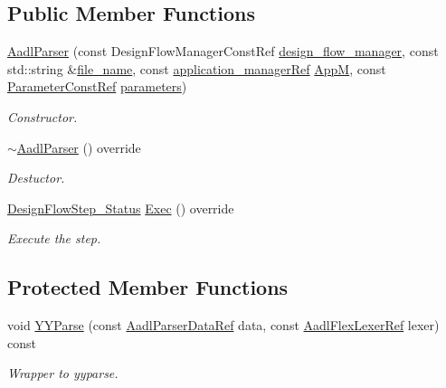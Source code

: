 \subsection*{Public Member Functions}
\begin{DoxyCompactItemize}
\item 
\hyperlink{classAadlParser_a7b62919f918da617e84f4bc2bec3f2c0}{Aadl\+Parser} (const Design\+Flow\+Manager\+Const\+Ref \hyperlink{classDesignFlowStep_ab770677ddf087613add30024e16a5554}{design\+\_\+flow\+\_\+manager}, const std\+::string \&\hyperlink{classParserFlowStep_a728b0a03e63e3529176b848880d12c72}{file\+\_\+name}, const \hyperlink{application__manager_8hpp_a04ccad4e5ee401e8934306672082c180}{application\+\_\+manager\+Ref} \hyperlink{classAadlParser_a3caa16a2aa1b023109ad23c60ee372d6}{AppM}, const \hyperlink{Parameter_8hpp_a37841774a6fcb479b597fdf8955eb4ea}{Parameter\+Const\+Ref} \hyperlink{classDesignFlowStep_a802eaafe8013df706370679d1a436949}{parameters})
\begin{DoxyCompactList}\small\item\em Constructor. \end{DoxyCompactList}\item 
\hyperlink{classAadlParser_ae24dea5fda2320c5a3dd44807557a1ed}{$\sim$\+Aadl\+Parser} () override
\begin{DoxyCompactList}\small\item\em Destuctor. \end{DoxyCompactList}\item 
\hyperlink{design__flow__step_8hpp_afb1f0d73069c26076b8d31dbc8ebecdf}{Design\+Flow\+Step\+\_\+\+Status} \hyperlink{classAadlParser_aded0aad8f9b66318957f0df1d027256b}{Exec} () override
\begin{DoxyCompactList}\small\item\em Execute the step. \end{DoxyCompactList}\end{DoxyCompactItemize}
\subsection*{Protected Member Functions}
\begin{DoxyCompactItemize}
\item 
void \hyperlink{classAadlParser_acecaf8ee4223f68c15c7d8087b09e544}{Y\+Y\+Parse} (const \hyperlink{aadl__parser_8hpp_a3c21c833ee79a0a6153a4d8549698b31}{Aadl\+Parser\+Data\+Ref} data, const \hyperlink{aadl__lexer_8hpp_ac7b58912355fa52acc39b13b270fecd5}{Aadl\+Flex\+Lexer\+Ref} lexer) const
\begin{DoxyCompactList}\small\item\em Wrapper to yyparse. \end{DoxyCompactList}\end{DoxyCompactItemize}

